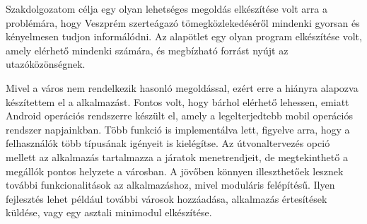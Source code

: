 
Szakdolgozatom célja egy olyan lehetséges megoldás elkészítése volt arra a problémára, hogy Veszprém szerteágazó tömegközlekedéséről mindenki gyorsan és kényelmesen tudjon informálódni.
Az alapötlet egy olyan program elkészítése volt, amely elérhető mindenki számára, és megbízható forrást nyújt az utazóközönségnek.

Mivel a város nem rendelkezik hasonló megoldással, ezért erre a hiányra alapozva készítettem el a  alkalmazást.
Fontos volt, hogy bárhol elérhető lehessen, emiatt Android operációs rendszerre készült el, amely a legelterjedtebb mobil operációs rendszer napjainkban. 
Több funkció is implementálva lett, figyelve arra, hogy a felhasználók több típusának igényeit is kielégítse.
Az útvonaltervezés opció mellett az alkalmazás tartalmazza a járatok menetrendjeit, de megtekinthető a megállók pontos helyzete a városban.
A jövőben könnyen illeszthetőek lesznek további funkcionalitások az alkalmazáshoz, mivel moduláris felépítésű.
Ilyen fejlesztés lehet például további városok hozzáadása, alkalmazás értesítések küldése, vagy egy asztali minimodul elkészítése.